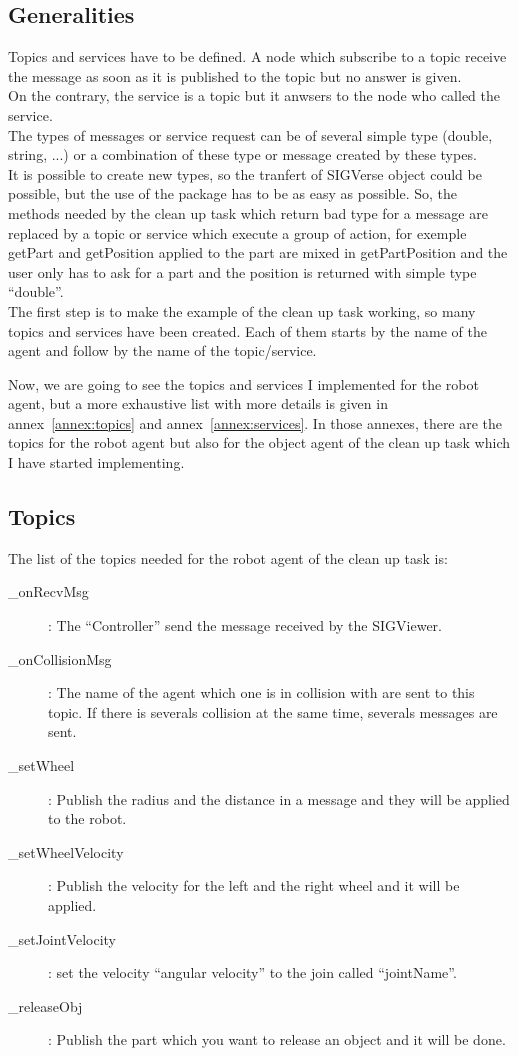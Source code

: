 \subsection{Generalities}
Topics and services have to be defined. A node which subscribe to a topic receive the message as soon as it is published to the topic but no answer is given.\\
On the contrary, the service is a topic but it anwsers to the node who called the service.\\
The types of messages or service request can be of several simple type (double, string, ...) or a combination of these type or message created by these types.\\
It is possible to create new types, so the tranfert of SIGVerse object could be possible, but the use of the package has to be as easy as possible. So, the methods needed by the clean up task which return bad type for a message are replaced by a topic or service which execute a group of action, for exemple getPart and getPosition applied to the part are mixed in getPartPosition and the user only has to ask for a part and the position is returned with simple type ``double''.\\

The first step is to make the example of the clean up task working, so many topics and services have been created. Each of them starts by the name of the agent and follow by the name of the topic/service.

Now, we are going to see the topics and services I implemented for the robot agent, but a more exhaustive list with more details is given in annex~\ref{annex:topics} and annex~\ref{annex:services}. In those annexes, there are the topics for the robot agent but also for the object agent of the clean up task which I have started implementing.

\subsection{Topics}
The list of the topics needed for the robot agent of the clean up task is:
\begin{description}
	\item[\_onRecvMsg] : The ``Controller'' send the message received by the SIGViewer.
	\item[\_onCollisionMsg] : The name of the agent which one is in collision with are sent to this topic. If there is severals collision at the same time, severals messages are sent.
	\item[\_setWheel] : Publish the radius and the distance in a message and they will be applied to the robot.
	\item[\_setWheelVelocity] : Publish the velocity for the left and the right wheel and it will be applied.
	\item[\_setJointVelocity] : set the velocity ``angular velocity'' to the join called ``jointName''.
	\item[\_releaseObj]: Publish the part which you want to release an object and it will be done.
\end{description}

